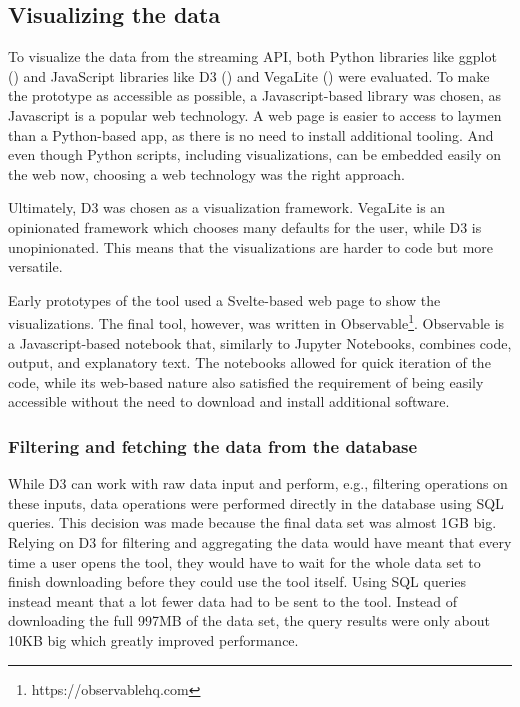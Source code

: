 \subsection{Visualizing the data}
To visualize the data from the streaming API, both Python libraries like ggplot (\cite{wickhamGgplot2ElegantGraphics2016}) and JavaScript libraries like D3 (\cite{bostockD3JsDataDriven}) and VegaLite (\cite{uwidlVegaLiteHighLevelGrammar}) were evaluated. To make the prototype as accessible as possible, a Javascript-based library was chosen, as Javascript is a popular web technology. A web page is easier to access to laymen than a Python-based app, as there is no need to install additional tooling. And even though Python scripts, including visualizations, can be embedded easily on the web now, choosing a web technology was the right approach.

Ultimately, D3 was chosen as a visualization framework. VegaLite is an opinionated framework which chooses many defaults for the user, while D3 is unopinionated. This means that the visualizations are harder to code but more versatile.

Early prototypes of the tool used a Svelte-based web page to show the visualizations. The final tool, however, was written in Observable\footnote{https://observablehq.com}. Observable is a Javascript-based notebook that, similarly to Jupyter Notebooks, combines code, output, and explanatory text. The notebooks allowed for quick iteration of the code, while its web-based nature also satisfied the requirement of being easily accessible without the need to download and install additional software.

\subsubsection{Filtering and fetching the data from the database}
While D3 can work with raw data input and perform, e.g., filtering operations on these inputs, data operations were performed directly in the database using SQL queries. This decision was made because the final data set was almost 1GB big. Relying on D3 for filtering and aggregating the data would have meant that every time a user opens the tool, they would have to wait for the whole data set to finish downloading before they could use the tool itself. Using SQL queries instead meant that a lot fewer data had to be sent to the tool. Instead of downloading the full 997MB of the data set, the query results were only about 10KB big which greatly improved performance.

